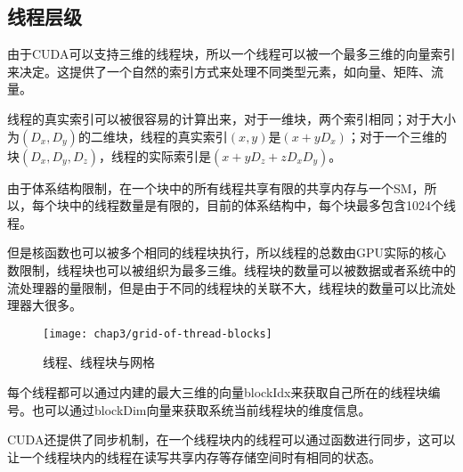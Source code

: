     \subsection{线程层级}
      由于CUDA可以支持三维的线程块，所以一个线程可以被一个最多三维的向量索引来决定。这提供了一个自然的索引方式来处理不同类型元素，如向量、矩阵、流量。
      \par
      线程的真实索引可以被很容易的计算出来，对于一维块，两个索引相同；对于大小为$(D_x,D_y)$的二维块，线程的真实索引$(x,y)$是$(x+yD_x)$；对于一个三维的块$(D_x,D_y,D_z)$，线程的实际索引是$(x+yD_z+zD_xD_y)$。
      \par
      由于体系结构限制，在一个块中的所有线程共享有限的共享内存与一个SM，所以，每个块中的线程数量是有限的，目前的体系结构中，每个块最多包含1024个线程。
      \par
      但是核函数也可以被多个相同的线程块执行，所以线程的总数由GPU实际的核心数限制，线程块也可以被组织为最多三维。线程块的数量可以被数据或者系统中的流处理器的量限制，但是由于不同的线程块的关联不大，线程块的数量可以比流处理器大很多。
      \begin{figure}[htp]
        \centering
        \texttt{[image: chap3/grid-of-thread-blocks]}
        \caption{线程、线程块与网格}
      \end{figure}
      每个线程都可以通过内建的最大三维的向量blockIdx来获取自己所在的线程块编号。也可以通过blockDim向量来获取系统当前线程块的维度信息。
      \par
      CUDA还提供了同步机制，在一个线程块内的线程可以通过函数进行同步，这可以让一个线程块内的线程在读写共享内存等存储空间时有相同的状态。
